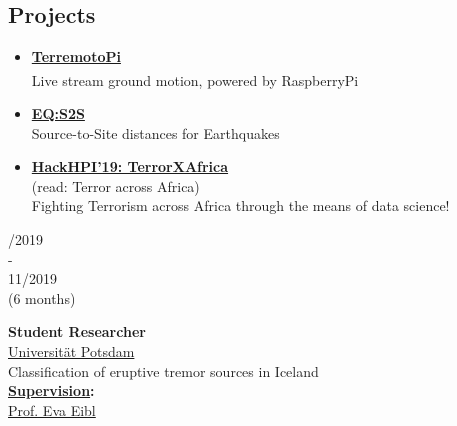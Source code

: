 \documentclass{article}
\begin{document}
\begin{minipage}[t]{0.69\textwidth}
\begin{minipage}{0.34\textwidth}
\begin{minipage}[t]{0.7\textwidth}
\begin{minipage}[t]{0.52\textwidth}
		\subsection*{\fontsize{18pt}{24pt}\selectfont \color{pblue} Projects}
		\begin{itemize}
		\item \textbf{\color{pblue}\underline{\color{pblue} \large TerremotoPi}} \href{https://github.com/silvioschwarz/TerremotoPi}{\Large \faGithub} \\
		Live stream ground motion, powered by RaspberryPi\textsuperscript{\textregistered}
		\item  \textbf{\color{pblue}\underline{\color{pblue} \large EQ:S2S}} \href{https://github.com/silvioschwarz/Earthquake-Distances}{\Large \faGithub}\\
			Source-to-Site distances for Earthquakes
		\item  \textbf{\color{pblue}\underline{\color{pblue}\large HackHPI'19: TerrorXAfrica}} \href{https://github.com/silvioschwarz/TerrorXAfrica}{\Large \faGithub}\\
		(read: Terror across Africa)\\
			Fighting Terrorism across Africa through the means of data science!
		\end{itemize}
		\end{minipage}	
		\hfill
		\vrule	
		\hfill
		\begin{minipage}[t]{0.45\textwidth}

\begin{minipage}[t]{0.25\textwidth}
		/2019\\ -\\ 11/2019 \\(6 months)
		\end{minipage}
		\hfill
		\begin{minipage}[t]{0.75\textwidth}
		\textbf{Student Researcher}\\
		\href{https://www.uni-potsdam.de/}{\color{pblue}Universität Potsdam}\\
	    Classification of eruptive tremor sources in Iceland\\
	      \textbf{\underline{Supervision}:}\\
	     \href{http://www.geo.uni-potsdam.de/mitarbeiterdetails/show/717/Eva_Eibl.html}{\color{pblue}Prof. Eva Eibl}
		\end{minipage}
		\vspace{0.3cm}
		

\end{minipage}
\end{minipage}
\end{minipage}
\end{minipage}
\end{document}
